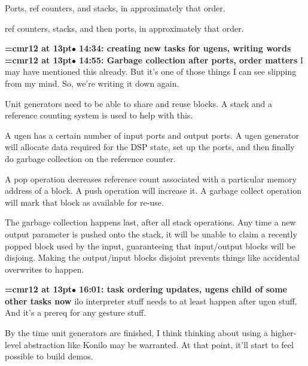Ports, ref counters, and stacks, in approximately that order.
\par

ref counters, stacks, and then ports, in approximately that order.
\par

{\smallskip\noindent\bf\font\titlefont=cmr12 at 13pt\titlefont $\bullet$ 14:34: creating new tasks for ugens, writing words}\smallskip
{\smallskip\noindent\bf\font\titlefont=cmr12 at 13pt\titlefont $\bullet$ 14:55: Garbage collection after ports, order matters}\smallskip
I may have mentioned this already. But it's one of those things I can see slipping from my mind. So, we're writing it down again.
\par

Unit generators need to be able to share and reuse blocks. A stack and a reference counting system is used to help with this.
\par

A ugen has a certain number of input ports and output ports. A ugen generator will allocate data required for the DSP state, set up the ports, and then finally do garbage collection on the reference counter.
\par

A pop operation decreases reference count associated with a particular memory address of a block. A push operation will increase it. A garbage collect operation will mark that block as available for re-use.
\par

The garbage collection happens last, after all stack operations. Any time a new output parameter is pushed onto the stack, it will be unable to claim a recently popped block used by the input, guaranteeing that input/output blocks will be disjoing. Making the output/input blocks disjoint prevents things like accidental overwrites to happen.
\par

{\smallskip\noindent\bf\font\titlefont=cmr12 at 13pt\titlefont $\bullet$ 16:01: task ordering updates, ugens child of some other tasks now}\smallskip
ilo interpreter stuff needs to at least happen after ugen stuff. And it's a prereq for any gesture stuff.
\par

By the time unit generators are finished, I think thinking about using a higher-level abstraction like Konilo may be warranted. At that point, it'll start to feel possible to build demos.
\par

